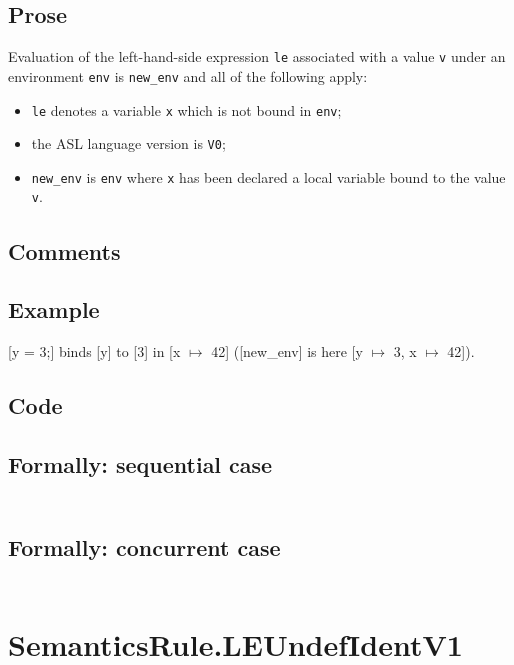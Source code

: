\documentclass{book}
\begin{document}
    \subsection{Prose}
    Evaluation of the left-hand-side expression \texttt{le} associated with a
value \texttt{v} under an environment \texttt{env} is \texttt{new\_env} and all
of the following apply:
    \begin{itemize}
    \item \texttt{le} denotes a variable \texttt{x} which is not bound in \texttt{env};
    \item the ASL language version is \texttt{V0};
    \item \texttt{new\_env} is \texttt{env} where \texttt{x} has been declared
a local variable bound to the value \texttt{v}.
    \end{itemize}

  \subsection{Comments}

  \subsection{Example}
  [y = 3;] binds [y] to [3] in [x $\mapsto$ 42] ([new\_env] is here [y $\mapsto$ 3, x $\mapsto$ 42]).

  \subsection{Code}

  \subsection{Formally: sequential case}
  \begin{align}
  \end{align} 

  \subsection{Formally: concurrent case}
  \begin{align}
  \end{align} 

\section{SemanticsRule.LEUndefIdentV1 \label{sec:SemanticsRule.LEUndefIdentV1}}
\end{document}
